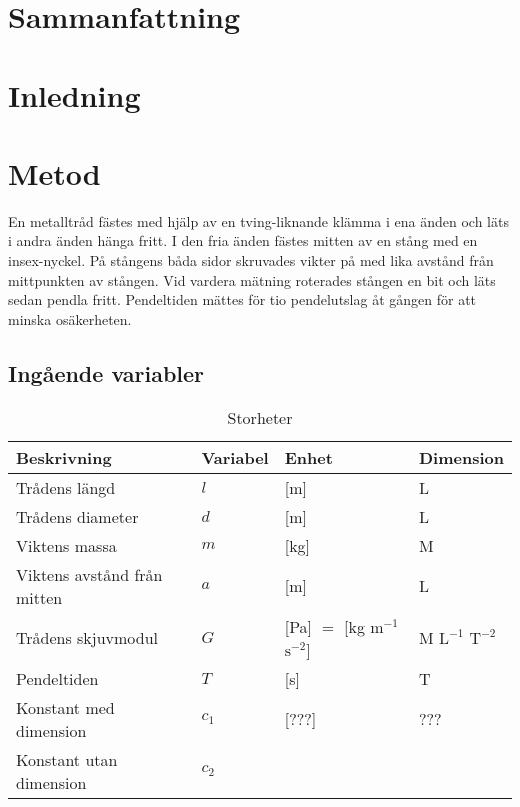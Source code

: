 \documentclass[a4paper,12pt]{article}
\begin{document}
\section*{Sammanfattning}
\clearpage

\tableofcontents
\clearpage

\section{Inledning}

\section{Metod}

En metalltråd fästes med hjälp av en tving-liknande klämma i ena änden och läts
i andra änden hänga fritt. I den fria änden fästes mitten av en stång med en
insex-nyckel. På stångens båda sidor skruvades vikter på med lika avstånd från
mittpunkten av stången. Vid vardera mätning roterades stången en bit och läts
sedan pendla fritt. Pendeltiden mättes för tio pendelutslag åt gången för att
minska osäkerheten.

\subsection{Ingående variabler}

\begin{table}[h!]
  \caption{Storheter}
  \label{tab:storheter}
  \begin{tabular} {| l | l | l | l |}
    \hline
    \textbf{Beskrivning} & \textbf{Variabel} & \textbf{Enhet} & \textbf{Dimension} \\\hline
    Trådens längd & $l$ & [m] & L \\\hline
    Trådens diameter & $d$ & [m] & L \\\hline
    Viktens massa & $m$ & [kg] & M \\\hline
    Viktens avstånd från mitten & $a$ & [m] & L \\\hline
    Trådens skjuvmodul & $G$ & [Pa] $=$ [kg $\mathrm{m}^{-1}$ $\mathrm{s}^{-2}$] & M $\mathrm{L}^{-1}$ $\mathrm{T}^{-2}$ \\\hline
    Pendeltiden & $T$ & [s] & T \\\hline
    Konstant med dimension & $c_1$ & [???] & ??? \\\hline
    Konstant utan dimension & $c_2$ && \\\hline
  \end{tabular}
\end{table}
\end{document}
